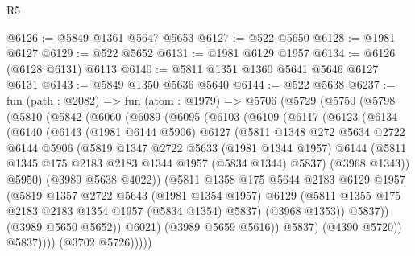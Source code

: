 \begin{lexlean}{R5}
\begin{coremodule}
@6126 := @5849 @1361 @5647 @5653
@6127 := @522 @5650
@6128 := @1981 @6127
@6129 := @522 @5652
@6131 := @1981 @6129 @1957
@6134 := @6126 (@6128 @6131) @6113
@6140 := @5811 @1351 @1360 @5641 @5646 @6127 @6131
@6143 := @5849 @1350 @5636 @5640
@6144 := @522 @5638
@6237 := fun (path : @2082) =>
  fun (atom : @1979) =>
  @5706
    (@5729
      (@5750
        (@5798
          (@5810
            (@5842
              (@6060
                (@6089
                  (@6095
                    (@6103
                      (@6109
                        (@6117
                          (@6123
                            (@6134
                              (@6140
                                (@6143
                                  (@1981 @6144 @5906)
                                  @6127
                                  (@5811
                                    @1348
                                    @272
                                    @5634
                                    @2722
                                    @6144
                                    @5906
                                    (@5819
                                      @1347
                                      @2722
                                      @5633
                                      (@1981 @1344 @1957)
                                      @6144
                                      (@5811 @1345 @175 @2183 @2183 @1344 @1957 (@5834 @1344) @5837)
                                      (@3968 @1343))
                                    @5950)
                                  (@3989 @5638 @4022))
                                (@5811
                                  @1358
                                  @175
                                  @5644
                                  @2183
                                  @6129
                                  @1957
                                  (@5819
                                    @1357
                                    @2722
                                    @5643
                                    (@1981 @1354 @1957)
                                    @6129
                                    (@5811 @1355 @175 @2183 @2183 @1354 @1957 (@5834 @1354) @5837)
                                    (@3968 @1353))
                                  @5837))
                              (@3989 @5650 @5652))
                            @6021)
                          (@3989 @5659 @5616))
                        @5837)
                      (@4390 @5720))
                    @5837))))
            (@3702 @5726)))))

\end{coremodule}
\end{lexlean}
